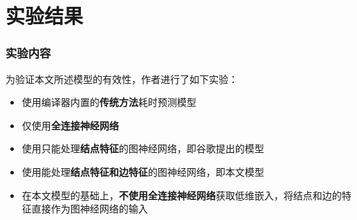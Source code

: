 \documentclass[notes=beamer]{ctexbeamer}
\begin{document}
\section{实验结果}

\begin{frame}
  \frametitle{实验内容}
  为验证本文所述模型的有效性，作者进行了如下实验：
  \begin{itemize}
    \item 使用编译器内置的\textbf{传统方法}耗时预测模型
    \item 仅使用\textbf{全连接神经网络}
    \item 使用只能处理\textbf{结点特征}的图神经网络，即谷歌提出的模型
    \item 使用能处理\textbf{结点特征和边特征}的图神经网络，即本文模型
    \item 在本文模型的基础上，\textbf{不使用全连接神经网络}获取低维嵌入，将结点和边的特征直接作为图神经网络的输入
  \end{itemize}
\end{frame}
\end{document}
